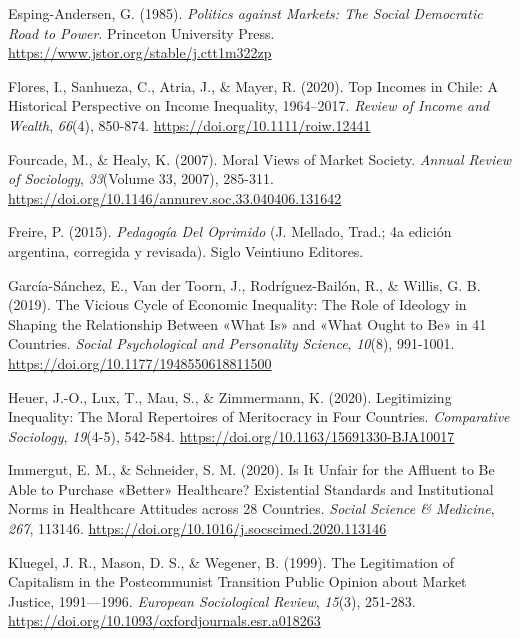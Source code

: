 \documentclass[
  spanish,
  a4paper,
  oneside]{scrbook}
\newlength{\cslhangindent}
\newenvironment{CSLReferences}[2] %
 {\begin{list}{}{%
  \setlength{\itemindent}{0pt}
  \setlength{\leftmargin}{0pt}
  \setlength{\parsep}{0pt}
  \ifodd #1
   \setlength{\leftmargin}{\cslhangindent}
   \setlength{\itemindent}{-1\cslhangindent}
  \fi
  \setlength{\itemsep}{#2\baselineskip}}}
 {\end{list}}
\begin{document}
\begin{CSLReferences}{1}{0}
Esping-Andersen, G. (1985). \emph{Politics against Markets: The Social
Democratic Road to Power}. Princeton University Press.
\url{https://www.jstor.org/stable/j.ctt1m322zp}

Flores, I., Sanhueza, C., Atria, J., \& Mayer, R. (2020). Top Incomes in
Chile: A Historical Perspective on Income Inequality, 1964--2017.
\emph{Review of Income and Wealth}, \emph{66}(4), 850-874.
\url{https://doi.org/10.1111/roiw.12441}

Fourcade, M., \& Healy, K. (2007). Moral Views of Market Society.
\emph{Annual Review of Sociology}, \emph{33}(Volume 33, 2007), 285-311.
\url{https://doi.org/10.1146/annurev.soc.33.040406.131642}

Freire, P. (2015). \emph{Pedagogía Del Oprimido} (J. Mellado, Trad.; 4a
edición argentina, corregida y revisada). Siglo Veintiuno Editores.

García-Sánchez, E., Van der Toorn, J., Rodríguez-Bailón, R., \& Willis,
G. B. (2019). The Vicious Cycle of Economic Inequality: The Role of
Ideology in Shaping the Relationship Between {«What Is»} and {«What
Ought to Be»} in 41 Countries. \emph{Social Psychological and
Personality Science}, \emph{10}(8), 991-1001.
\url{https://doi.org/10.1177/1948550618811500}

Heuer, J.-O., Lux, T., Mau, S., \& Zimmermann, K. (2020). Legitimizing
Inequality: The Moral Repertoires of Meritocracy in Four Countries.
\emph{Comparative Sociology}, \emph{19}(4-5), 542-584.
\url{https://doi.org/10.1163/15691330-BJA10017}

Immergut, E. M., \& Schneider, S. M. (2020). Is It Unfair for the
Affluent to Be Able to Purchase {«Better»} Healthcare? Existential
Standards and Institutional Norms in Healthcare Attitudes across 28
Countries. \emph{Social Science \& Medicine}, \emph{267}, 113146.
\url{https://doi.org/10.1016/j.socscimed.2020.113146}

Kluegel, J. R., Mason, D. S., \& Wegener, B. (1999). The Legitimation of
Capitalism in the Postcommunist Transition Public Opinion about Market
Justice, 1991---1996. \emph{European Sociological Review}, \emph{15}(3),
251-283. \url{https://doi.org/10.1093/oxfordjournals.esr.a018263}


\end{CSLReferences}
\end{document}
